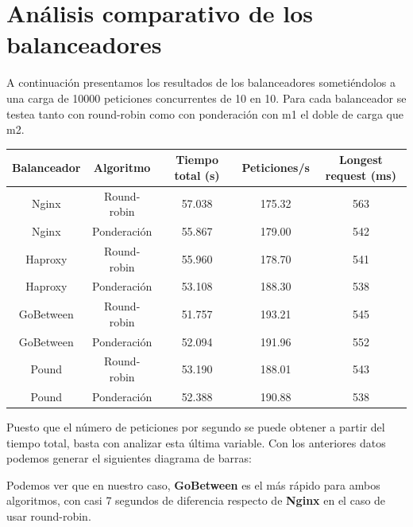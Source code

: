 \documentclass[twoside]{article}
\begin{document}
\section{Análisis comparativo de los balanceadores}
A continuación presentamos los resultados de los balanceadores sometiéndolos a una carga de 10000 peticiones concurrentes de 10 en 10. Para cada balanceador se testea tanto con round-robin como con ponderación con m1 el doble de carga que m2.
 \begin{center}
    \begin{tabular}{|c|c|c|c|c|}
        \hline
        Balanceador & Algoritmo & Tiempo total (s) & Peticiones/s & Longest request (ms) \\
        \hline
        Nginx & Round-robin & 57.038 & 175.32 & 563 \\
        \hline
        Nginx & Ponderación & 55.867 & 179.00 & 542 \\
        \hline
        Haproxy & Round-robin & 55.960 & 178.70 & 541 \\
        \hline
        Haproxy & Ponderación & 53.108 & 188.30 & 538 \\
        \hline
        GoBetween & Round-robin & 51.757 & 193.21 & 545 \\
        \hline
        GoBetween & Ponderación & 52.094 & 191.96 & 552 \\
        \hline
        Pound & Round-robin & 53.190 & 188.01 & 543 \\
        \hline
        Pound & Ponderación & 52.388 & 190.88 & 538 \\
        \hline
    \end{tabular}
 \end{center}

Puesto que el número de peticiones por segundo se puede obtener a partir del tiempo total, basta con analizar esta última variable. Con los anteriores datos podemos generar el siguientes diagrama de barras:
\begin{center}
\end{center}
Podemos ver que en nuestro caso, \textbf{GoBetween} es el más rápido para ambos algoritmos, con casi 7 segundos de diferencia respecto de \textbf{Nginx} en el caso de usar round-robin.
\end{document}
